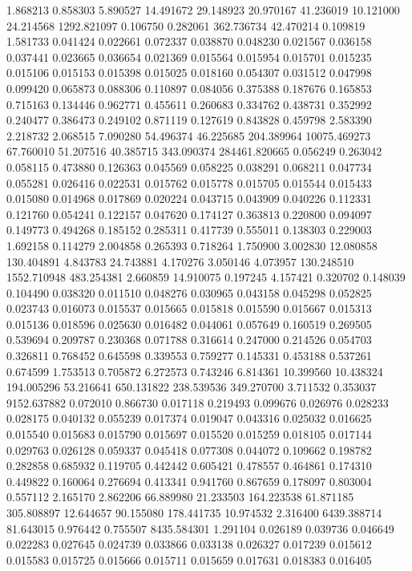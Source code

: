 1.868213
0.858303
5.890527
14.491672
29.148923
20.970167
41.236019
10.121000
24.214568
1292.821097
0.106750
0.282061
362.736734
42.470214
0.109819
1.581733
0.041424
0.022661
0.072337
0.038870
0.048230
0.021567
0.036158
0.037441
0.023665
0.036654
0.021369
0.015564
0.015954
0.015701
0.015235
0.015106
0.015153
0.015398
0.015025
0.018160
0.054307
0.031512
0.047998
0.099420
0.065873
0.088306
0.110897
0.084056
0.375388
0.187676
0.165853
0.715163
0.134446
0.962771
0.455611
0.260683
0.334762
0.438731
0.352992
0.240477
0.386473
0.249102
0.871119
0.127619
0.843828
0.459798
2.583390
2.218732
2.068515
7.090280
54.496374
46.225685
204.389964
10075.469273
67.760010
51.207516
40.385715
343.090374
284461.820665
0.056249
0.263042
0.058115
0.473880
0.126363
0.045569
0.058225
0.038291
0.068211
0.047734
0.055281
0.026416
0.022531
0.015762
0.015778
0.015705
0.015544
0.015433
0.015080
0.014968
0.017869
0.020224
0.043715
0.043909
0.040226
0.112331
0.121760
0.054241
0.122157
0.047620
0.174127
0.363813
0.220800
0.094097
0.149773
0.494268
0.185152
0.285311
0.417739
0.555011
0.138303
0.229003
1.692158
0.114279
2.004858
0.265393
0.718264
1.750900
3.002830
12.080858
130.404891
4.843783
24.743881
4.170276
3.050146
4.073957
130.248510
1552.710948
483.254381
2.660859
14.910075
0.197245
4.157421
0.320702
0.148039
0.104490
0.038320
0.011510
0.048276
0.030965
0.043158
0.045298
0.052825
0.023743
0.016073
0.015537
0.015665
0.015818
0.015590
0.015667
0.015313
0.015136
0.018596
0.025630
0.016482
0.044061
0.057649
0.160519
0.269505
0.539694
0.209787
0.230368
0.071788
0.316614
0.247000
0.214526
0.054703
0.326811
0.768452
0.645598
0.339553
0.759277
0.145331
0.453188
0.537261
0.674599
1.753513
0.705872
6.272573
0.743246
6.814361
10.399560
10.438324
194.005296
53.216641
650.131822
238.539536
349.270700
3.711532
0.353037
9152.637882
0.072010
0.866730
0.017118
0.219493
0.099676
0.026976
0.028233
0.028175
0.040132
0.055239
0.017374
0.019047
0.043316
0.025032
0.016625
0.015540
0.015683
0.015790
0.015697
0.015520
0.015259
0.018105
0.017144
0.029763
0.026128
0.059337
0.045418
0.077308
0.044072
0.109662
0.198782
0.282858
0.685932
0.119705
0.442442
0.605421
0.478557
0.464861
0.174310
0.449822
0.160064
0.276694
0.413341
0.941760
0.867659
0.178097
0.803004
0.557112
2.165170
2.862206
66.889980
21.233503
164.223538
61.871185
305.808897
12.644657
90.155080
178.441735
10.974532
2.316400
6439.388714
81.643015
0.976442
0.755507
8435.584301
1.291104
0.026189
0.039736
0.046649
0.022283
0.027645
0.024739
0.033866
0.033138
0.026327
0.017239
0.015612
0.015583
0.015725
0.015666
0.015711
0.015659
0.017631
0.018383
0.016405
